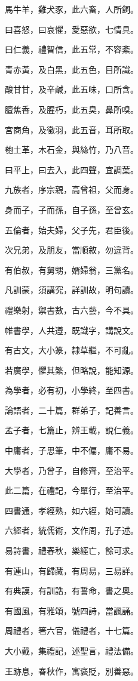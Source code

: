 \documentclass[12pt,a4paper]{ctexbook}
\begin{document}
馬牛羊，雞犬豕，此六畜，人所飼。\par
曰喜怒，曰哀懼，愛惡欲，七情具。\par
曰仁義，禮智信，此五常，不容紊。\par
青赤黃，及白黑，此五色，目所識。\par
酸甘甘，及辛鹹，此五味，口所含。\par
膻焦香，及腥朽，此五臭，鼻所嗅。\par
宮商角，及徵羽，此五音，耳所取。\par
匏土革，木石金，與絲竹，乃八音。\par
曰平上，曰去入，此四聲，宜調葉。\par
九族者，序宗親，高曾祖，父而身。\par
身而子，子而孫，自子孫，至曾玄。\par
五倫者，始夫婦，父子先，君臣後。\par
次兄弟，及朋友，當順敘，勿違背。\par
有伯叔，有舅甥，婿婦翁，三黨名。\par
凡訓蒙，須講究，詳訓故，明句讀。\par
禮樂射，禦書數，古六藝，今不具。\par
帷書學，人共遵，既識字，講說文。\par
有古文，大小篆，隸草繼，不可亂。\par
若廣學，懼其繁，但略說，能知源。\par
為學者，必有初，小學終，至四書。\par
論語者，二十篇，群弟子，記善言。\par
孟子者，七篇止，辨王載，說仁義。\par
中庸者，子思筆，中不偏，庸不易。\par
大學者，乃曾子，自修齊，至治平。\par
此二篇，在禮記，今單行，至治平。\par
四書通，孝經熟，如六經，始可讀。\par
六經者，統儒術，文作周，孔子述。\par
易詩書，禮春秋，樂經亡，餘可求。\par
有連山，有歸藏，有周易，三易詳。\par
有典謨，有訓誥，有誓命，書之奧。\par
有國風，有雅頌，號四詩，當諷誦。\par
周禮者，箸六官，儀禮者，十七篇。\par
大小戴，集禮記，述聖言，禮法備。\par
王跡息，春秋作，寓褒貶，別善惡。\par
\end{document}
